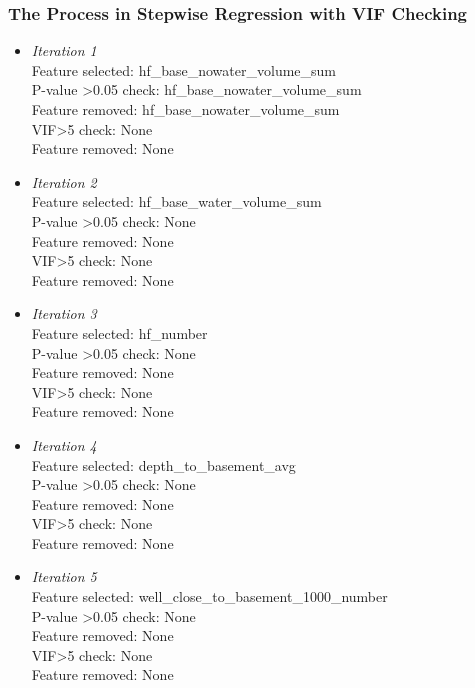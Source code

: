 \documentclass[final-report]{report-template}
\begin{document}
\subsubsection{The Process in Stepwise Regression with VIF Checking}
\label{sec:feature_selection_process}
\begin{itemize}
    \item \textit{Iteration 1}\\
    Feature selected: hf\_base\_nowater\_volume\_sum\\
    P-value \textgreater 0.05 check: hf\_base\_nowater\_volume\_sum\\
    Feature removed: hf\_base\_nowater\_volume\_sum\\
    VIF\textgreater 5 check: None\\
    Feature removed: None
    
    \item \textit{Iteration 2}\\
    Feature selected: hf\_base\_water\_volume\_sum\\
    P-value \textgreater 0.05 check: None\\
    Feature removed: None\\
    VIF\textgreater 5 check: None\\
    Feature removed: None\\
    
    \item \textit{Iteration 3}\\
    Feature selected: hf\_number\\
    P-value \textgreater 0.05 check: None\\
    Feature removed: None\\
    VIF\textgreater 5 check: None\\
    Feature removed: None\\
    
    \item \textit{Iteration 4}\\
    Feature selected: depth\_to\_basement\_avg\\
    P-value \textgreater 0.05 check: None\\
    Feature removed: None\\
    VIF\textgreater 5 check: None\\
    Feature removed: None\\
    
    \item \textit{Iteration 5}\\
    Feature selected: well\_close\_to\_basement\_1000\_number\\
    P-value \textgreater 0.05 check: None\\
    Feature removed: None\\
    VIF\textgreater 5 check: None\\
    Feature removed: None\\
    

\end{itemize}
\end{document}
